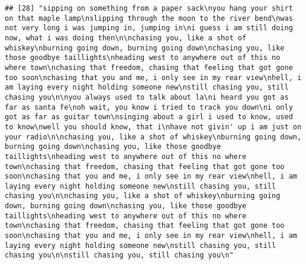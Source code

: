 \documentclass[]{article}
\begin{document}
\begin{verbatim}
## [28] "sipping on something from a paper sack\nyou hang your shirt on that maple lamp\nslipping through the moon to the river bend\nwas not very long i was jumping in, jumping in\ni guess i am still doing now, what i was doing then\n\nchasing you, like a shot of whiskey\nburning going down, burning going down\nchasing you, like those goodbye taillights\nheading west to anywhere out of this no where town\nchasing that freedom, chasing that feeling that got gone too soon\nchasing that you and me, i only see in my rear view\nhell, i am laying every night holding someone new\nstill chasing you, still chasing you\n\nyou always used to talk about la\ni heard you got as far as santa fe\noh wait, you know i tried to track you down\ni only got as far as guitar town\nsinging about a girl i used to know, used to know\nwell you should know, that i\nhave not givin' up i am just on your radio\n\nchasing you, like a shot of whiskey\nburning going down, burning going down\nchasing you, like those goodbye taillights\nheading west to anywhere out of this no where town\nchasing that freedom, chasing that feeling that got gone too soon\nchasing that you and me, i only see in my rear view\nhell, i am laying every night holding someone new\nstill chasing you, still chasing you\n\nchasing you, like a shot of whiskey\nburning going down, burning going down\nchasing you, like those goodbye taillights\nheading west to anywhere out of this no where town\nchasing that freedom, chasing that feeling that got gone too soon\nchasing that you and me, i only see in my rear view\nhell, i am laying every night holding someone new\nstill chasing you, still chasing you\n\nstill chasing you, still chasing you\n"                                                                                                                                                                                                                                                                                                                                                                                                                                                                                                                                                                                                                                                                                                                                                                                                                                                                                                                                                                                                                                                                                                                                                                                                                   

\end{verbatim}
\end{document}

